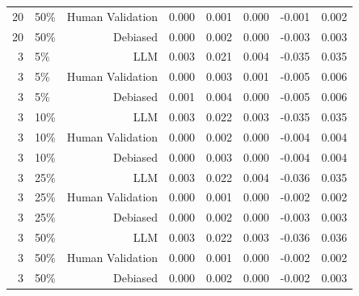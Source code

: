\begin{table}
\begin{tabular}[t]{rlrrrrrr}
20 & 50\% & Human Validation & 0.000 & 0.001 & 0.000 & -0.001 & 0.002\\
20 & 50\% & Debiased & 0.000 & 0.002 & 0.000 & -0.003 & 0.003\\
3 & 5\% & LLM & 0.003 & 0.021 & 0.004 & -0.035 & 0.035\\
3 & 5\% & Human Validation & 0.000 & 0.003 & 0.001 & -0.005 & 0.006\\
3 & 5\% & Debiased & 0.001 & 0.004 & 0.000 & -0.005 & 0.006\\
3 & 10\% & LLM & 0.003 & 0.022 & 0.003 & -0.035 & 0.035\\
3 & 10\% & Human Validation & 0.000 & 0.002 & 0.000 & -0.004 & 0.004\\
3 & 10\% & Debiased & 0.000 & 0.003 & 0.000 & -0.004 & 0.004\\
3 & 25\% & LLM & 0.003 & 0.022 & 0.004 & -0.036 & 0.035\\
3 & 25\% & Human Validation & 0.000 & 0.001 & 0.000 & -0.002 & 0.002\\
3 & 25\% & Debiased & 0.000 & 0.002 & 0.000 & -0.003 & 0.003\\
3 & 50\% & LLM & 0.003 & 0.022 & 0.003 & -0.036 & 0.036\\
3 & 50\% & Human Validation & 0.000 & 0.001 & 0.000 & -0.002 & 0.002\\
3 & 50\% & Debiased & 0.000 & 0.002 & 0.000 & -0.002 & 0.003\\
\bottomrule
\end{tabular}
\end{table}
